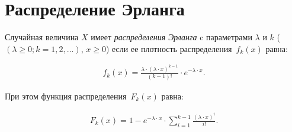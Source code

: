 \chapter{Распределение Эрланга}

Случайная величина $X$ имеет \textit{распределения Эрланга} c параметрами $\lambda$ и $k$ ($(\lambda \geqslant 0; k = 1, 2, ...)$, $x \geqslant 0$) если ее плотность распределения~$f_k(x)$ равна:

\begin{equation}
	\begin{aligned}
		f_k(x) = \frac{\lambda \cdot (\lambda \cdot x)^{k - 1}}{(k - 1)!} \cdot e^{-\lambda \cdot x}.
	\end{aligned}
\end{equation}

При этом функция распределения~$F_k(x)$ равна:

\begin{equation}
	\begin{aligned}
		F_k(x) = 1 - e^{-\lambda \cdot x} \cdot \sum_{i = 1}^{k - 1} \frac{(\lambda \cdot x)^i}{i!}.
	\end{aligned}
\end{equation}



